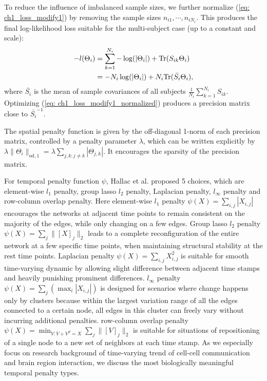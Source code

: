 To reduce the influence of imbalanced sample sizes, 
we further normalize (\ref{eq: ch1_loss_modify1}) by removing the sample sizes $n_{i1},\cdots,n_{iN_i}$. 
This produces the final log-likelihood loss suitable for the multi-subject case (up to a constant and scale): 
\begin{align}
    \label{eq: ch1_loss_modify1_normalized}
    -l(\Theta_i) &= \sum_{k=1}^{N_i}-\log(|\Theta_i|)+\text{Tr}(S_{ik}\Theta_i) \notag \\
                 &= -N_i\log(|\Theta_i|)+N_i\text{Tr}(\bar{S_i}\Theta_i), 
\end{align}
where $\bar{S_i}$ is the mean of sample covariances of all subjects $\frac{1}{N_i}\sum_{k=1}^{N_i}S_{ik}$. 
Optimizing (\ref{eq: ch1_loss_modify1_normalized}) produces a precision matrix close to $\bar{S_i}^{-1}$.

The spatial penalty function is given by the off-diagonal 1-norm of each precision matrix, 
controlled by a penalty parameter $\lambda$, 
which can be written explicitly by $\lambda\|\Theta_i\|_{\text{od},1}=\lambda\sum_{j,k:j\neq k}|\Theta_{j,k}|$. 
It encourages the sparsity of the precision matrix.

For temporal penalty function $\psi$, 
Hallac et al.\cite{hallac2017networkinferencetimevaryinggraphical} proposed 5 choices, 
which are element-wise $l_1$ penalty, group lasso $l_2$ penalty, Laplacian penalty, 
$l_{\infty}$ penalty and row-column overlap penalty. 
Here element-wise $l_1$ penalty $\psi(X)=\sum_{i,j}|X_{i,j}|$ 
encourages the networks at adjacent time points to remain consistent on the majority of the edges, 
while only changing on a few edges. 
Group lasso $l_2$ penalty $\psi(X)=\sum_{j}\|[X]_j\|_2$ 
leads to a complete reconfiguration of the entire network at a few specific time points, 
when maintaining structural stability at the rest time points.
Laplacian penalty $\psi(X)=\sum_{i,j}X_{i,j}^2$ is suitable for smooth time-varying dynamic 
by allowing slight difference between adjacent time stamps and heavily punishing prominent differences. 
$l_{\infty}$ penalty $\psi(X)=\sum_{j}(\max_i|X_{i,j}|)$ is designed for scenarios where change happens only by clusters
because within the largest variation range of all the edges connected to a certain node, 
all edges in this cluster can freely vary without incurring additional penalties.
row-column overlap penalty $\psi(X)=\min_{V:V+V^T=X}\sum_{j}\|[V]_j\|_2$ is suitable for situations of repositioning of a single node to a new set of neighbors at each time stamp.
As we especially focus on research background of time-varying trend of cell-cell communication and brain region interaction, 
we discuss the most biologically meaningful temporal penalty types.

